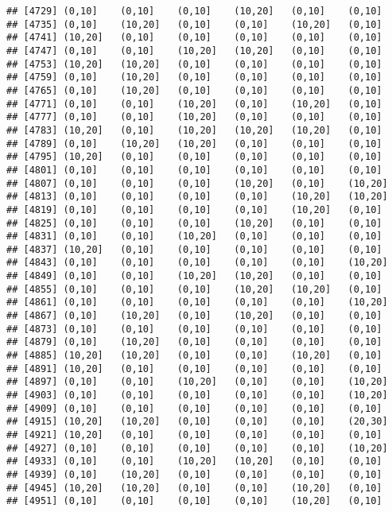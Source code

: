 \documentclass[]{article}
\begin{document}
\begin{verbatim}
## [4729] (0,10]    (0,10]    (0,10]    (10,20]   (0,10]    (0,10]   
## [4735] (0,10]    (10,20]   (0,10]    (0,10]    (10,20]   (0,10]   
## [4741] (10,20]   (0,10]    (0,10]    (0,10]    (0,10]    (0,10]   
## [4747] (0,10]    (0,10]    (10,20]   (10,20]   (0,10]    (0,10]   
## [4753] (10,20]   (10,20]   (0,10]    (0,10]    (0,10]    (0,10]   
## [4759] (0,10]    (10,20]   (0,10]    (0,10]    (0,10]    (0,10]   
## [4765] (0,10]    (10,20]   (0,10]    (0,10]    (0,10]    (0,10]   
## [4771] (0,10]    (0,10]    (10,20]   (0,10]    (10,20]   (0,10]   
## [4777] (0,10]    (0,10]    (10,20]   (0,10]    (0,10]    (0,10]   
## [4783] (10,20]   (0,10]    (10,20]   (10,20]   (10,20]   (0,10]   
## [4789] (0,10]    (10,20]   (10,20]   (0,10]    (0,10]    (0,10]   
## [4795] (10,20]   (0,10]    (0,10]    (0,10]    (0,10]    (0,10]   
## [4801] (0,10]    (0,10]    (0,10]    (0,10]    (0,10]    (0,10]   
## [4807] (0,10]    (0,10]    (0,10]    (10,20]   (0,10]    (10,20]  
## [4813] (0,10]    (0,10]    (0,10]    (0,10]    (10,20]   (10,20]  
## [4819] (0,10]    (0,10]    (0,10]    (0,10]    (10,20]   (0,10]   
## [4825] (0,10]    (0,10]    (0,10]    (10,20]   (0,10]    (0,10]   
## [4831] (0,10]    (0,10]    (10,20]   (0,10]    (0,10]    (0,10]   
## [4837] (10,20]   (0,10]    (0,10]    (0,10]    (0,10]    (0,10]   
## [4843] (0,10]    (0,10]    (0,10]    (0,10]    (0,10]    (10,20]  
## [4849] (0,10]    (0,10]    (10,20]   (10,20]   (0,10]    (0,10]   
## [4855] (0,10]    (0,10]    (0,10]    (10,20]   (10,20]   (0,10]   
## [4861] (0,10]    (0,10]    (0,10]    (0,10]    (0,10]    (10,20]  
## [4867] (0,10]    (10,20]   (0,10]    (10,20]   (0,10]    (0,10]   
## [4873] (0,10]    (0,10]    (0,10]    (0,10]    (0,10]    (0,10]   
## [4879] (0,10]    (10,20]   (0,10]    (0,10]    (0,10]    (0,10]   
## [4885] (10,20]   (10,20]   (0,10]    (0,10]    (10,20]   (0,10]   
## [4891] (10,20]   (0,10]    (0,10]    (0,10]    (0,10]    (0,10]   
## [4897] (0,10]    (0,10]    (10,20]   (0,10]    (0,10]    (10,20]  
## [4903] (0,10]    (0,10]    (0,10]    (0,10]    (0,10]    (10,20]  
## [4909] (0,10]    (0,10]    (0,10]    (0,10]    (0,10]    (0,10]   
## [4915] (10,20]   (10,20]   (0,10]    (0,10]    (0,10]    (20,30]  
## [4921] (10,20]   (0,10]    (0,10]    (0,10]    (0,10]    (0,10]   
## [4927] (0,10]    (0,10]    (0,10]    (0,10]    (0,10]    (10,20]  
## [4933] (0,10]    (0,10]    (10,20]   (10,20]   (0,10]    (0,10]   
## [4939] (0,10]    (10,20]   (0,10]    (0,10]    (0,10]    (0,10]   
## [4945] (10,20]   (10,20]   (0,10]    (0,10]    (10,20]   (0,10]   
## [4951] (0,10]    (0,10]    (0,10]    (0,10]    (10,20]   (0,10]   

\end{verbatim}
\end{document}
